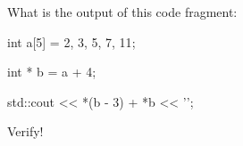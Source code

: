 What is the output of this code fragment:



\begin{consolethree}[escapeinside=||]

int a[5] = {2, 3, 5, 7, 11};

int * b = a + 4;

std::cout << *(b - 3) + *b << '\n';

\end{consolethree}



Verify!

